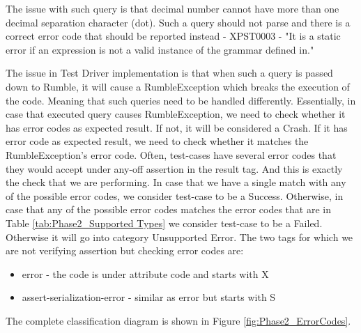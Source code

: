 

The issue with such query is that decimal number cannot have more than one decimal separation character (dot). Such a query should not parse and there is a correct error code that should be reported instead - XPST0003 - "It is a static error if an expression is not a valid instance of the grammar defined in." 

The issue in Test Driver implementation is that when such a query is passed down to Rumble, it will cause a RumbleException which breaks the execution of the code. Meaning that such queries need to be handled differently. Essentially, in case that executed query causes RumbleException, we need to check whether it has error codes as expected result. If not, it will be considered a Crash. If it has error code as expected result, we need to check whether it matches the RumbleException's error code. Often, test-cases have several error codes that they would accept under any-off assertion in the result tag. And this is exactly the check that we are performing. In case that we have a single match with any of the possible error codes, we consider test-case to be a Success. Otherwise, in case that any of the possible error codes matches the error codes that are in Table \ref{tab:Phase2_Supported Types} we consider test-case to be a Failed. Otherwise it will go into category Unsupported Error. The two tags for which we are not verifying assertion but checking error codes are:
\begin{itemize}
	\item error - the code is under attribute code and starts with X
	\item assert-serialization-error - similar as error but starts with S
\end{itemize}
The complete classification diagram is shown in Figure \ref{fig:Phase2_ErrorCodes}.

